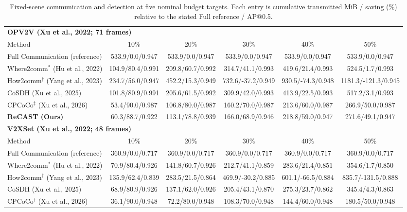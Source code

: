 \begin{table}[t]
\centering
\caption{Fixed-scene communication and detection at five nominal budget targets. Each entry is cumulative transmitted MiB / saving (\%) relative to the stated Full reference / AP@0.5.}
\label{tab:comm-ap-audit}
\scriptsize
\setlength{\tabcolsep}{2.2pt}
\renewcommand{\arraystretch}{1.03}
\begin{tabular}{lccccc}
\toprule
\multicolumn{6}{l}{\textbf{OPV2V (Xu et al., 2022; 71 frames)}} \\
Method & 10\% & 20\% & 30\% & 40\% & 50\% \\
\midrule
Full Communication (reference) & 533.9/0.0/0.947 & 533.9/0.0/0.947 & 533.9/0.0/0.947 & 533.9/0.0/0.947 & 533.9/0.0/0.947 \\
Where2comm$^{*}$ (Hu et al., 2022) & 104.9/80.4/0.991 & 209.8/60.7/0.992 & 314.7/41.1/0.993 & 419.6/21.4/0.993 & 524.5/1.7/0.993 \\
How2comm$^{\dagger}$ (Yang et al., 2023) & 234.7/56.0/0.947 & 452.2/15.3/0.949 & 732.6/-37.2/0.949 & 930.5/-74.3/0.948 & 1181.3/-121.3/0.945 \\
CoSDH (Xu et al., 2025) & 101.8/80.9/0.991 & 205.6/61.5/0.992 & 309.9/42.0/0.993 & 413.9/22.5/0.993 & 517.2/3.1/0.993 \\
CPCoCo$^{\ddagger}$ (Xu et al., 2026) & 53.4/90.0/0.987 & 106.8/80.0/0.987 & 160.2/70.0/0.987 & 213.6/60.0/0.987 & 266.9/50.0/0.987 \\
\textbf{ReCAST (Ours)} & 60.3/88.7/0.922 & 113.1/78.8/0.939 & 166.0/68.9/0.946 & 218.8/59.0/0.947 & 271.6/49.1/0.947 \\
\midrule
\multicolumn{6}{l}{\textbf{V2XSet (Xu et al., 2022; 48 frames)}} \\
Method & 10\% & 20\% & 30\% & 40\% & 50\% \\
\midrule
Full Communication (reference) & 360.9/0.0/0.717 & 360.9/0.0/0.717 & 360.9/0.0/0.717 & 360.9/0.0/0.717 & 360.9/0.0/0.717 \\
Where2comm$^{*}$ (Hu et al., 2022) & 70.9/80.4/0.926 & 141.8/60.7/0.926 & 212.7/41.1/0.859 & 283.6/21.4/0.851 & 354.6/1.7/0.850 \\
How2comm$^{\dagger}$ (Yang et al., 2023) & 135.9/62.4/0.839 & 283.5/21.5/0.864 & 469.9/-30.2/0.885 & 601.1/-66.5/0.884 & 835.7/-131.5/0.888 \\
CoSDH (Xu et al., 2025) & 68.9/80.9/0.926 & 137.1/62.0/0.926 & 205.4/43.1/0.870 & 275.3/23.7/0.862 & 345.4/4.3/0.863 \\
CPCoCo$^{\ddagger}$ (Xu et al., 2026) & 36.1/90.0/0.948 & 72.2/80.0/0.948 & 108.3/70.0/0.948 & 144.4/60.0/0.948 & 180.5/50.0/0.948 \\

\end{tabular}
\end{table}
